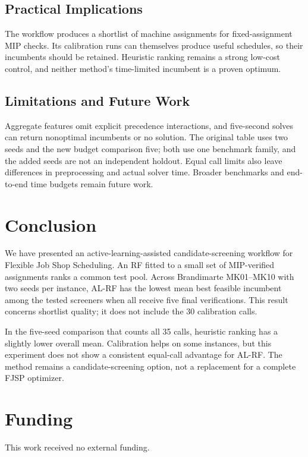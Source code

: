 \documentclass[conference]{IEEEtran}
\begin{document}
\subsection{Practical Implications}
The workflow produces a shortlist of machine assignments for fixed-assignment MIP checks. Its calibration runs can themselves produce useful schedules, so their incumbents should be retained. Heuristic ranking remains a strong low-cost control, and neither method's time-limited incumbent is a proven optimum.

\subsection{Limitations and Future Work}
Aggregate features omit explicit precedence interactions, and five-second solves can return nonoptimal incumbents or no solution. The original table uses two seeds and the new budget comparison five; both use one benchmark family, and the added seeds are not an independent holdout. Equal call limits also leave differences in preprocessing and actual solver time. Broader benchmarks and end-to-end time budgets remain future work.

\section{Conclusion}

We have presented an active-learning-assisted candidate-screening workflow for Flexible Job Shop Scheduling. An RF fitted to a small set of MIP-verified assignments ranks a common test pool. Across Brandimarte MK01--MK10 with two seeds per instance, AL-RF has the lowest mean best feasible incumbent among the tested screeners when all receive five final verifications. This result concerns shortlist quality; it does not include the 30 calibration calls.

In the five-seed comparison that counts all 35 calls, heuristic ranking has a slightly lower overall mean. Calibration helps on some instances, but this experiment does not show a consistent equal-call advantage for AL-RF. The method remains a candidate-screening option, not a replacement for a complete FJSP optimizer.

\section*{Funding}
This work received no external funding.
\end{document}
